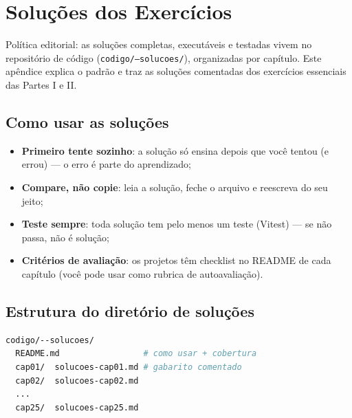 \chapter{Soluções dos Exercícios}
\label{apendice:solucoes}

\begin{caixaconceito}
Política editorial: as soluções completas, executáveis e testadas vivem no
repositório de código (\texttt{codigo/--solucoes/}), organizadas por capítulo.
Este apêndice explica o padrão e traz as soluções comentadas dos exercícios
essenciais das Partes I e II.
\end{caixaconceito}

\section{Como usar as soluções}

\begin{itemize}[leftmargin=*, itemsep=0.4em]
  \item \textbf{Primeiro tente sozinho}: a solução só ensina depois que você
  tentou (e errou) — o erro é parte do aprendizado;
  \item \textbf{Compare, não copie}: leia a solução, feche o arquivo e
  reescreva do seu jeito;
  \item \textbf{Teste sempre}: toda solução tem pelo menos um teste
  (Vitest) — se não passa, não é solução;
  \item \textbf{Critérios de avaliação}: os projetos têm checklist no README
  de cada capítulo (você pode usar como rubrica de autoavaliação).
\end{itemize}

\section{Estrutura do diretório de soluções}

\begin{lstlisting}[style=livro, language=Bash, caption={Organização das soluções.}, label={list:sol-estrutura}]
codigo/--solucoes/
  README.md                 # como usar + cobertura
  cap01/  solucoes-cap01.md # gabarito comentado
  cap02/  solucoes-cap02.md
  ...
  cap25/  solucoes-cap25.md
\end{lstlisting}

